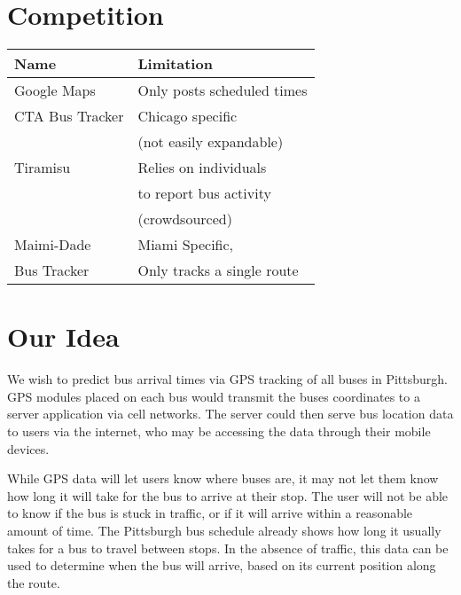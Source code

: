 \documentclass[pageno]{jpaper}
\begin{document}
\section{Competition}

\begin{table}[h!]
  \centering
  \begin{tabular}{|l|l|}
    \hline
    \textbf{Name} & \textbf{Limitation}\\
    \hline
    \hline
    Google Maps & Only posts scheduled times \\
    \hline
    CTA Bus Tracker & Chicago specific \\
        &(not easily expandable)\cite{CTA} \\
    \hline
    Tiramisu & Relies on individuals \\
                    &to report bus activity\\
                    &(crowdsourced) \cite{Tiramisu}\\
    \hline
    Maimi-Dade  & Miami Specific,\\
    Bus Tracker & Only tracks a single route \\
    \hline
  \end{tabular}
  \label{table:formatting}
\end{table}

\section{Our Idea}

We wish to predict bus arrival times via GPS tracking of all buses in Pittsburgh.
GPS modules placed on each bus would transmit the buses coordinates to a server
application via cell networks. The server could then serve bus location data
to users via the internet, who may be accessing the data through their mobile
devices.

While GPS data will let users know where buses are, it may not let them
know how long it will take for the bus to arrive at their stop. The user will
not be able to know if the bus is stuck in traffic, or if it will arrive within
a reasonable amount of time. The Pittsburgh bus schedule already shows how long
it usually takes for a bus to travel between stops. In the absence of traffic,
this data can be used to determine when the bus will arrive, based on its current
position along the route.
\end{document}
